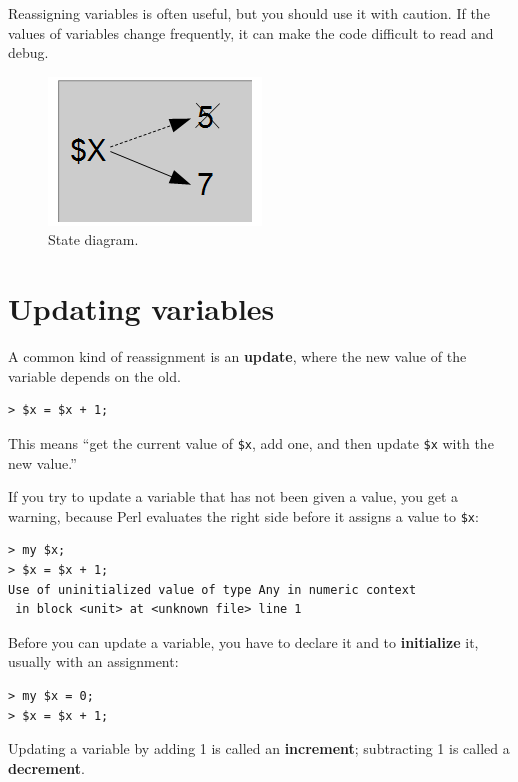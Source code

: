 Reassigning variables is often useful, but you should use it
with caution.  If the values of variables change frequently, it can
make the code difficult to read and debug.

\begin{figure}
\centerline
{\includegraphics[scale=0.5]{figs/reassignment.png}}
\caption{State diagram.}
\label{fig.assign2}
\end{figure}



\section{Updating variables}
\label{update}


A common kind of reassignment is an {\bf update},
where the new value of the variable depends on the old.

\begin{verbatim}
> $x = $x + 1;
\end{verbatim}
%
This means ``get the current value of {\tt \$x}, add one, and then
update {\tt \$x} with the new value.''

If you try to update a variable that has not been given a value, 
you get a warning, because Perl evaluates the right side 
before it assigns a value to {\tt \$x}:

\begin{verbatim}
> my $x;
> $x = $x + 1;
Use of uninitialized value of type Any in numeric context 
 in block <unit> at <unknown file> line 1
\end{verbatim}
%
Before you can update a variable, you have to declare it and 
to {\bf initialize} it, usually with an assignment:

\begin{verbatim}
> my $x = 0;
> $x = $x + 1;
\end{verbatim}
%
Updating a variable by adding 1 is called an {\bf increment};
subtracting 1 is called a {\bf decrement}.

